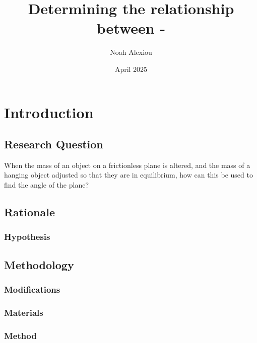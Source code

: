 \documentclass[11pt,a4paper]{article}
\begin{document}
\begin{titlepage}


\title{Determining the relationship between - }

\author{Noah Alexiou}


\date{April 2025}

\maketitle
\centering

\end{titlepage}
\tableofcontents
\newpage

\section{Introduction}

\subsection{Research Question}
When the mass of an object on a frictionless plane is altered, and the mass of a hanging object adjusted so that they are in equilibrium, how can this be used to find the angle of the plane?

\subsection{Rationale}

\subsubsection{Hypothesis}


\subsection{Methodology}

\subsubsection{Modifications}

\subsubsection{Materials}

\subsubsection{Method}
\end{document}
